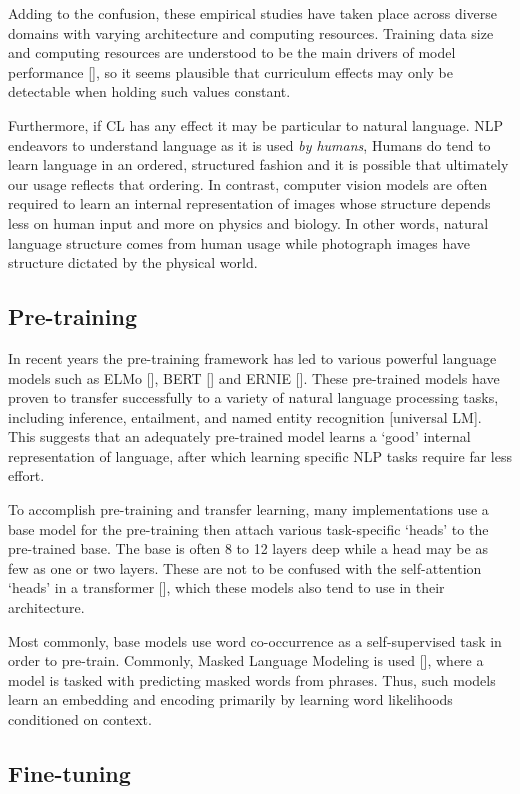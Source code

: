 \documentclass{article}
\begin{document}
Adding to the confusion, these empirical studies have taken place across diverse domains with varying architecture and computing resources. Training data size and computing resources are understood to be the main drivers of model performance [], so it seems plausible that curriculum effects may only be detectable when holding such values constant. 

Furthermore, if CL has any effect it may be particular to natural language. NLP endeavors to understand language as it is used \emph{by humans}, Humans do tend to learn language in an ordered, structured fashion and it is possible that ultimately our usage reflects that ordering. In contrast, computer vision models are often required to learn an internal representation of images whose structure depends less on human input and more on physics and biology. In other words, natural language structure comes from human usage while photograph images have structure dictated by the physical world.

\subsection{Pre-training}

In recent years the pre-training framework has led to various powerful language models such as ELMo [], BERT [] and ERNIE []. These pre-trained models have proven to transfer successfully to a variety of natural language processing tasks, including inference, entailment, and named entity recognition [universal LM]. This suggests that an adequately pre-trained model learns a `good' internal representation of language, after which learning specific NLP tasks require far less effort.

To accomplish pre-training and transfer learning, many implementations use a base model for the pre-training then attach various task-specific `heads' to the pre-trained base. The base is often 8 to 12 layers deep while a head may be as few as one or two layers. These are not to be confused with the self-attention `heads' in a transformer [], which these models also tend to use in their architecture.

Most commonly, base models use word co-occurrence as a self-supervised task in order to pre-train. Commonly, Masked Language Modeling is used [], where a model is tasked with predicting masked words from phrases. Thus, such models learn an embedding and encoding primarily by learning word likelihoods conditioned on context.

\subsection{Fine-tuning}
\end{document}
